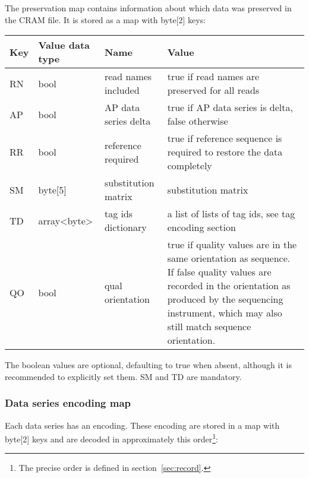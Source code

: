 \documentclass[a4paper]{article}
\begin{document}
The preservation map contains information about which data was preserved in the 
CRAM file. It is stored as a map with byte[2] keys:

\begin{tabular}{|l|l|>{\raggedright}p{100pt}|>{\raggedright}p{220pt}|}
\hline
\textbf{Key} & \textbf{Value data type} & \textbf{Name} & \textbf{Value}\tabularnewline
\hline
RN & bool & read names included & true if read names are preserved for all reads\tabularnewline
\hline
AP & bool & AP data series delta & true if AP data series is delta, false otherwise\tabularnewline
\hline
RR & bool & reference required & true if reference sequence is required to restore 
the data completely\tabularnewline
\hline
SM & byte[5] & substitution matrix & substitution matrix\tabularnewline
\hline
TD & array<byte> & tag ids dictionary & a list of lists of tag ids, see tag encoding 
section\tabularnewline
\hline
QO & bool & qual orientation & true if quality values are in the same orientation as sequence.  If false quality values are recorded in the orientation as produced by the sequencing instrument, which may also still match sequence orientation.\tabularnewline
\hline
\end{tabular}

The boolean values are optional, defaulting to true when absent, although it is recommended to explicitly set them.  SM and TD are mandatory.

\subsubsection*{Data series encoding map}

Each data series has an encoding. These encoding are stored in a map with byte[2] 
keys and are decoded in approximately this order\footnote{The precise order is defined in section~\ref{sec:record}.}:
\end{document}
